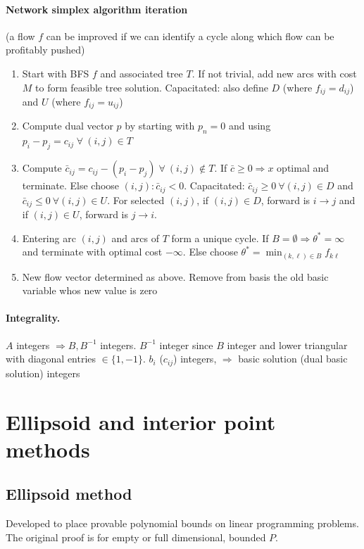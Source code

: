 \documentclass{article}
\begin{document}
\paragraph{Network simplex algorithm iteration} (a flow $f$ can be improved if we can identify a cycle along which flow can be profitably pushed)
\begin{enumerate}
    \item Start with BFS $f$ and associated tree $T$. If not trivial, add new arcs with cost $M$ to form feasible tree solution. Capacitated: also define $D$ (where $f_{ij}=d_{ij}$) and $U$ (where $f_{ij} = u_{ij}$)
    \item Compute dual vector $p$ by starting with $p_n=0$ and using $p_i-p_j=c_{ij}\;\forall\ (i,j)\in T$
    \item Compute $\bar c_{ij} = c_{ij} - (p_i - p_j)\;\forall\ (i,j)\notin T$. If $\bar c \geq 0 \Rightarrow x$ optimal and terminate. Else choose $(i,j): \bar c_{ij} < 0$. Capacitated: $\bar c_{ij} \geq 0\ \forall(i,j)\in D$ and $\bar c_{ij} \leq 0\ \forall(i,j)\in U$. For selected $(i,j)$, if $(i,j)\in D$, forward is $i\rightarrow j$ and if $(i,j)\in U$, forward is $j\rightarrow i$. 
    \item Entering arc $(i,j)$ and arcs of $T$ form a unique cycle. If $B=\emptyset\Longrightarrow \theta^*=\infty$ and terminate with optimal cost $-\infty$. Else choose $\theta^* = \min_{(k,\ell)\in B} f_{k\ell}$
    \item New flow vector determined as above. Remove from basis the old basic variable whos new value is zero
\end{enumerate}
\paragraph{Integrality.} $A$ integers $\Rightarrow B,B^{-1}$ integers. $B^{-1}$ integer since $B$ integer and lower triangular with diagonal entries $\in\{1, -1\}$. $b_i$ ($c_{ij}$) integers, $\Rightarrow$ basic solution (dual basic solution) integers


\section{Ellipsoid and interior point methods}
\subsection{Ellipsoid method}
Developed to place provable polynomial bounds on linear programming problems. The original proof is for empty or full dimensional, bounded $P$.  
\end{document}
